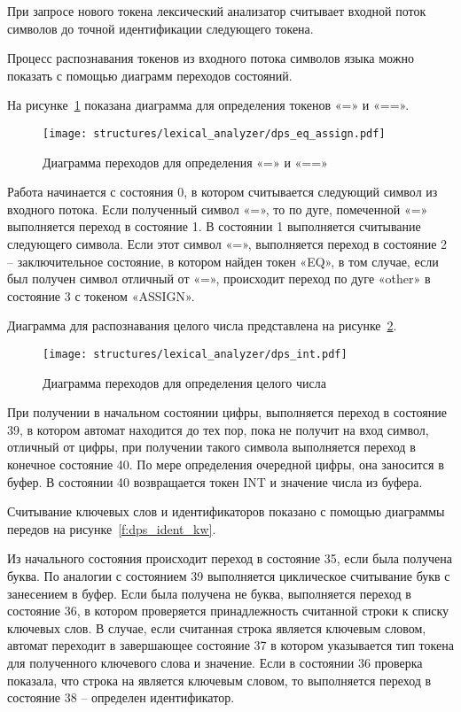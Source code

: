 При запросе нового токена лексический анализатор считывает входной поток символов до точной идентификации следующего токена.

Процесс распознавания токенов из входного потока символов языка можно показать с помощью диаграмм переходов состояний.

На рисунке~\ref{f:dps_eq_assign} показана диаграмма для определения токенов «=» и «==».

\begin{figure}[ht]
	\centering
	\vspace{\toppaddingoffigure}
	\texttt{[image: structures/lexical\_analyzer/dps\_eq\_assign.pdf]}
	\caption{Диаграмма переходов для определения «=» и «==»}
	\label{f:dps_eq_assign}
\end{figure}

Работа начинается с состояния 0, в котором считывается следующий символ из входного потока.
Если полученный символ «=», то по дуге, помеченной «=» выполняется переход в состояние 1.
В состоянии 1 выполняется считывание следующего символа.
Если этот символ «=», выполняется переход в состояние 2 – заключительное состояние,
в котором найден токен «EQ», в том случае, если был получен символ отличный от «=»,
происходит переход по дуге «other» в состояние 3 с токеном «ASSIGN».

Диаграмма для распознавания целого числа представлена на рисунке~\ref{f:dps_int}.

\begin{figure}[ht]
	\centering
	\vspace{\toppaddingoffigure}
	\texttt{[image: structures/lexical\_analyzer/dps\_int.pdf]}
	\caption{Диаграмма переходов для определения целого числа}
	\label{f:dps_int}
\end{figure}

При получении в начальном состоянии цифры, выполняется переход в состояние 39, в котором автомат находится до тех пор,
пока не получит на вход символ, отличный от цифры, при получении такого символа выполняется переход в конечное состояние 40.
По мере определения очередной цифры, она заносится в буфер.
В состоянии 40 возвращается токен INT и значение числа из буфера.

Считывание ключевых слов и идентификаторов показано с помощью диаграммы передов на рисунке~\ref{f:dps_ident_kw}.

Из начального состояния происходит переход в состояние 35, если была получена буква.
По аналогии с состоянием 39 выполняется циклическое считывание букв с занесением в буфер.
Если была получена не буква, выполняется переход в состояние 36, в котором проверяется принадлежность считанной строки к списку ключевых слов.
В случае, если считанная строка является ключевым словом, автомат переходит в завершающее состояние 37 в котором указывается тип токена для полученного ключевого слова и значение.
Если в состоянии 36 проверка показала, что строка на является ключевым словом, то выполняется переход в состояние 38 – определен идентификатор.

